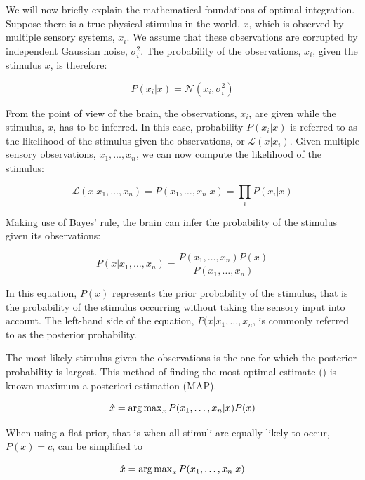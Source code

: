 We will now briefly explain the mathematical foundations of optimal integration. Suppose there is a true physical stimulus in the world, $x$, which is observed by multiple sensory systems, $x_i$. We assume that these observations are corrupted by independent Gaussian noise, $\sigma_i^2$. The probability of the observations, $x_i$, given the stimulus $x$, is therefore:

\begin{equation}
P(x_i|x)= \mathcal{N}(x_i, \sigma_i^2)
\end{equation}

From the point of view of the brain, the observations, $x_i$, are given while the stimulus, $x$, has to be inferred. In this case, probability $P(x_i|x)$ is referred to as the likelihood of the stimulus given the observations, or $\mathcal{L}(x|x_i)$. Given multiple sensory observations, $x_1,\dotsc,x_n$, we can now compute the likelihood of the stimulus:

\begin{equation}
\mathcal{L}(x|x_1,\dotsc,x_n) = P(x_1,\dotsc,x_n|x) = \prod_i P(x_i|x)
\end{equation}

Making use of Bayes' rule, the brain can infer the probability of the stimulus given its observations:

\begin{equation}
P(x|x_1,\dotsc,x_n) = \frac{P(x_1,\dotsc,x_n)P(x)}{P(x_1,\dotsc,x_n)}
\end{equation}

In this equation, $P(x)$ represents the prior probability of the stimulus, that is the probability of the stimulus occurring without taking the sensory input into account. The left-hand side of the equation, $P(x|x_1,\dotsc,x_n$, is commonly referred to as the posterior probability.

The most likely stimulus given the observations is  the one for which the posterior probability is largest. This method of finding the most optimal estimate () is known maximum a posteriori estimation (MAP).

\begin{equation}
\hat{x} = \operatorname{arg\,max}_x P(x_1,\dotsc,x_n|x)P(x)
\label{intro:eq:map}
\end{equation}

When using a flat prior, that is when all stimuli are equally likely to occur, $P(x)=c$,  can be simplified to

\begin{equation}
\hat{x} = \operatorname{arg\,max}_x P(x_1,\dotsc,x_n|x)
\label{intro:eq:mle}
\end{equation}

